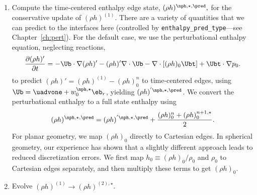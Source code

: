 \begin{description}
\begin{enumerate}
\begin{enumerate}
\renewcommand{\labelenumii}{{\bf \roman{enumii}}.}

\item Compute the time-centered enthalpy edge state, $(\rho h)^{\nph,\star,\pred},$
  for the conservative update of $(\rho h)^{(1)}$.  There are a variety
   of quantities that we can predict to the interfaces here (controlled
   by {\tt enthalpy\_pred\_type}---see Chapter~\ref{ch:pert}).  For
   the default case, we use the perturbational
  enthalpy equation, neglecting reactions,
\begin{equation}
\frac{\partial(\rho h)'}{\partial t} = -\Ub\cdot\nabla(\rho h)' - 
   (\rho h)'\nabla\cdot\Ub - \nabla\cdot\left[(\rho h)_0\Ubt\right] + \Ubt\cdot\nabla p_0 
    \label{eq:Perturbational Enthalpy}.
\end{equation}
  to predict
  $(\rho h)' = (\rho h)^{(1)} - (\rho h)_0^n$ to time-centered edges, 
  using $\Ub = \uadvone+w_0^{\nph,\star} \eb_r$,
  yielding $(\rho h)^{'\nph,\star,\pred}$.  We convert the perturbational 
  enthalpy to a full state enthalpy using
\begin{equation}
(\rho h)^{\nph,\star,\pred} = (\rho h)^{'\nph,\star,\pred} + \frac{(\rho h)_0^n + (\rho h)_0^{n+1,\star}}{2}.
\end{equation}
  For planar geometry, we map $(\rho h)_0$ directly to Cartesian edges.
  In spherical geometry, our experience has shown that a slightly different
  approach leads to reduced discretization errors.  We first map 
  $h_0 \equiv (\rho h)_0/\rho_0$ and $\rho_0$ to Cartesian edges separately, 
  and then multiply these terms to get $(\rho h)_0$.

\item Evolve $(\rho h)^{(1)} \rightarrow (\rho h)^{(2),\star}$.


\end{enumerate}
\end{enumerate}
\end{description}
